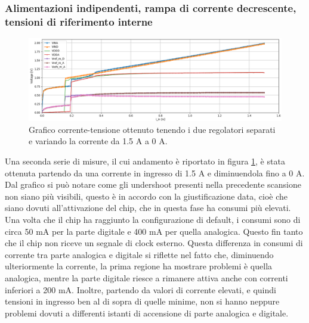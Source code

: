 \subsubsection{Alimentazioni indipendenti, rampa di corrente decrescente, tensioni di riferimento interne}
\begin{figure}
\centering
\includegraphics[scale=.3]{Immagini/IDI2}
\caption{Grafico corrente-tensione ottenuto tenendo i due regolatori separati e variando la corrente da 1.5 A a 0 A.}
\label{IDI}
\end{figure}

Una seconda serie di misure, il cui andamento è riportato in figura \ref{IDI}, è stata ottenuta partendo da una corrente in ingresso di 1.5 A e diminuendola fino a 0 A. 
Dal grafico si può notare come gli undershoot presenti nella precedente scansione non siano più visibili, questo è in accordo con la giustificazione data, cioè che siano dovuti all'attivazione del chip, che in questa fase ha consumi più elevati. 
Una volta che il chip ha raggiunto la configurazione di default, i consumi sono di circa 50 mA per la parte digitale e 400 mA per quella analogica. Questo fin tanto che il chip non riceve un segnale di clock esterno. 
Questa differenza in consumi di corrente tra parte analogica e digitale si riflette nel fatto che, diminuendo ulteriormente la corrente, la prima regione ha mostrare problemi è quella analogica, mentre la parte digitale riesce a rimanere attiva anche con correnti inferiori a 200 mA. 
Inoltre, partendo da valori di corrente elevati, e quindi tensioni in ingresso ben al di sopra di quelle minime, non si hanno neppure problemi dovuti a differenti istanti di accensione di parte analogica e digitale.
% 
%
%

